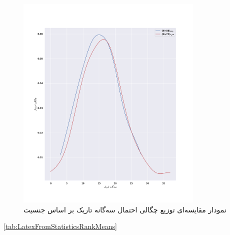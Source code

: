\begin{figure}[htpb]
    \centering
    \includegraphics[width=0.8\textwidth]{./img/PDFGramDTRSex.png}
    \caption{نمودار مقایسه‌ای توزیع چگالی احتمال سه‌گانه تاریک بر اساس جنسیت}
    \label{fig:PDFGramDTRSex}
\end{figure}






\eqref{tab:LatexFromStatisticsRankMeans}

